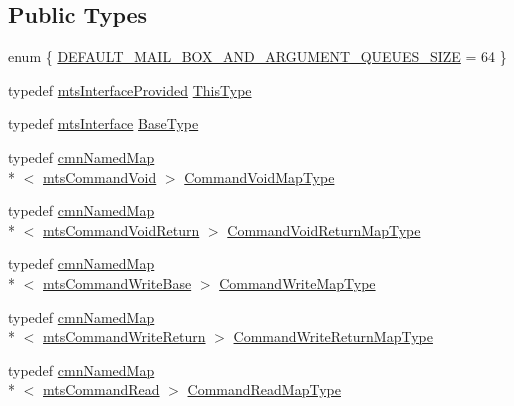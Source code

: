 \subsection*{Public Types}
\begin{DoxyCompactItemize}
\item 
enum \{ \hyperlink{classmts_interface_provided_aa7ef9189c81a481484a7f70bdd60b0d6a33b84c3e16f4aac5a431ebd0f1aa848f}{D\-E\-F\-A\-U\-L\-T\-\_\-\-M\-A\-I\-L\-\_\-\-B\-O\-X\-\_\-\-A\-N\-D\-\_\-\-A\-R\-G\-U\-M\-E\-N\-T\-\_\-\-Q\-U\-E\-U\-E\-S\-\_\-\-S\-I\-Z\-E} = 64
 \}
\item 
typedef \hyperlink{classmts_interface_provided}{mts\-Interface\-Provided} \hyperlink{classmts_interface_provided_a487e1de997186e03ed38d365592fd180}{This\-Type}
\item 
typedef \hyperlink{classmts_interface}{mts\-Interface} \hyperlink{classmts_interface_provided_a7c7eb6689ef61272efe9bfcabeecdbc6}{Base\-Type}
\item 
typedef \hyperlink{classcmn_named_map}{cmn\-Named\-Map}\\*
$<$ \hyperlink{classmts_command_void}{mts\-Command\-Void} $>$ \hyperlink{classmts_interface_provided_af8414fb168541e531244967e0cc1afd2}{Command\-Void\-Map\-Type}
\item 
typedef \hyperlink{classcmn_named_map}{cmn\-Named\-Map}\\*
$<$ \hyperlink{classmts_command_void_return}{mts\-Command\-Void\-Return} $>$ \hyperlink{classmts_interface_provided_a963eeb4ba8e38411de4d40f983d5b4b3}{Command\-Void\-Return\-Map\-Type}
\item 
typedef \hyperlink{classcmn_named_map}{cmn\-Named\-Map}\\*
$<$ \hyperlink{classmts_command_write_base}{mts\-Command\-Write\-Base} $>$ \hyperlink{classmts_interface_provided_ad6809b9c0d16a2eb490429e6adace990}{Command\-Write\-Map\-Type}
\item 
typedef \hyperlink{classcmn_named_map}{cmn\-Named\-Map}\\*
$<$ \hyperlink{classmts_command_write_return}{mts\-Command\-Write\-Return} $>$ \hyperlink{classmts_interface_provided_aaf1b5a70c029bb3c3bc2280ae1513c01}{Command\-Write\-Return\-Map\-Type}
\item 
typedef \hyperlink{classcmn_named_map}{cmn\-Named\-Map}\\*
$<$ \hyperlink{classmts_command_read}{mts\-Command\-Read} $>$ \hyperlink{classmts_interface_provided_ab6a636c8cfda921a078ae1df8d90e087}{Command\-Read\-Map\-Type}
\item 

\end{DoxyCompactItemize}
